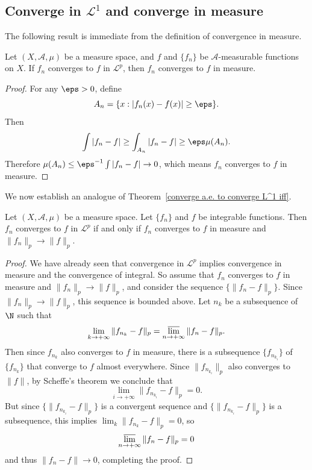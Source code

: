 \subsection{Converge in $\mathcal{L}^1$ and converge in measure}
The following result is immediate from the definition of convergence in measure.
\begin{proposition}\label{converge in L^1 imply in measure}
Let $(X,\mathcal{A},\mu)$ be a measure space, and $f$ and $\{f_n\}$ be $\mathcal{A}$-measurable functions on $X$. If $f_n$ converges to $f$ in $\mathcal{L}^p$, then $f_n$ converges to $f$ in measure.
\end{proposition}
\begin{proof}
For any $\eps>0$, define
\[A_n=\{x:|f_n(x)-f(x)|\geq\eps\}.\]
Then
\[\int|f_n-f|\geq\int_{A_n}|f_n-f|\geq\eps\mu(A_n).\]
Therefore $\mu(A_n)\leq\eps^{-1}\int|f_n-f|\to 0$, which means $f_n$ converges to $f$ in measure.
\end{proof}
We now establish an analogue of Theorem~\ref{converge a.e. to converge L^1 iff}. 
\begin{theorem}\label{convergence in L^p iff in measure and int|f_n|to int|f|}
Let $(X,\mathcal{A},\mu)$ be a measure space. Let $\{f_n\}$ and $f$ be integrable functions. Then $f_n$ converges to $f$ in $\mathcal{L}^p$ if and only if $f_n$ converges to $f$ in measure and $\|f_n\|_p\to\|f\|_p$.
\end{theorem}
\begin{proof}
We have already seen that convergence in $\mathcal{L}^p$ implies convergence in measure and the convergence of integral. So assume that $f_n$ converges to $f$ in measure and $\|f_n\|_p\to\|f\|_p$, and consider the sequence $\{\|f_n-f\|_p\}$. Since $\|f_n\|_p\to\|f\|_p$, this sequence is bounded above. Let $n_k$ be a subsequence of $\N$ such that
\[\lim_{k\to+\infty}\|f_{n_k}-f\|_p=\varlimsup_{n\to+\infty}\|f_n-f\|_p.\]
Then since $f_{n_k}$ also converges to $f$ in measure, there is a subsequence $\{f_{n_{k_i}}\}$ of $\{f_{n_k}\}$ that converge to $f$ almost everywhere. Since $\|f_{n_{k_i}}\|_p$ also converges to $\|f\|$, by Scheffe's theorem we conclude that
\[\lim_{i\to+\infty}\|f_{n_{k_i}}-f\|_p=0.\]
But since $\{\|f_{n_{k_i}}-f\|_p\}$ is a convergent sequence and $\{\|f_{n_{k_i}}-f\|_p\}$ is a subsequence, this implies $\lim_k\|f_{n_k}-f\|_p=0$, so 
\[\varlimsup_{n\to+\infty}\|f_n-f\|_p=0\]
and thus $\|f_n-f\|\to 0$, completing the proof.
\end{proof}
